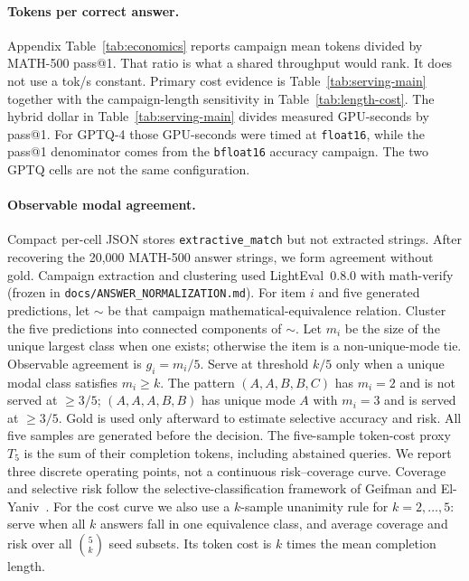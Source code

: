 \documentclass[11pt,a4paper]{article}
\begin{document}
\paragraph{Tokens per correct answer.}
Appendix Table~\ref{tab:economics} reports campaign mean tokens divided by MATH-500 pass@1. That ratio is what a shared throughput would rank. It does not use a tok/s constant. Primary cost evidence is Table~\ref{tab:serving-main} together with the campaign-length sensitivity in Table~\ref{tab:length-cost}. The hybrid dollar in Table~\ref{tab:serving-main} divides measured GPU-seconds by pass@1. For GPTQ-4 those GPU-seconds were timed at \texttt{float16}, while the pass@1 denominator comes from the \texttt{bfloat16} accuracy campaign. The two GPTQ cells are not the same configuration.

\paragraph{Observable modal agreement.}
\label{sec:modal-def}
Compact per-cell JSON stores \texttt{extractive\_match} but not extracted strings. After recovering the 20{,}000 MATH-500 answer strings, we form agreement without gold. Campaign extraction and clustering used LightEval~0.8.0 with math-verify (frozen in \texttt{docs/ANSWER\_NORMALIZATION.md}). For item $i$ and five generated predictions, let $\sim$ be that campaign mathematical-equivalence relation. Cluster the five predictions into connected components of $\sim$. Let $m_i$ be the size of the unique largest class when one exists; otherwise the item is a non-unique-mode tie. Observable agreement is $g_i=m_i/5$. Serve at threshold $k/5$ only when a unique modal class satisfies $m_i\ge k$. The pattern $(A,A,B,B,C)$ has $m_i=2$ and is not served at $\ge 3/5$; $(A,A,A,B,B)$ has unique mode $A$ with $m_i=3$ and is served at $\ge 3/5$. Gold is used only afterward to estimate selective accuracy and risk. All five samples are generated before the decision. The five-sample token-cost proxy $T_5$ is the sum of their completion tokens, including abstained queries. We report three discrete operating points, not a continuous risk--coverage curve. Coverage and selective risk follow the selective-classification framework of Geifman and El-Yaniv~\cite{geifman2017selective}. For the cost curve we also use a $k$-sample unanimity rule for $k=2,\dots,5$: serve when all $k$ answers fall in one equivalence class, and average coverage and risk over all $\binom{5}{k}$ seed subsets. Its token cost is $k$ times the mean completion length.
\end{document}
